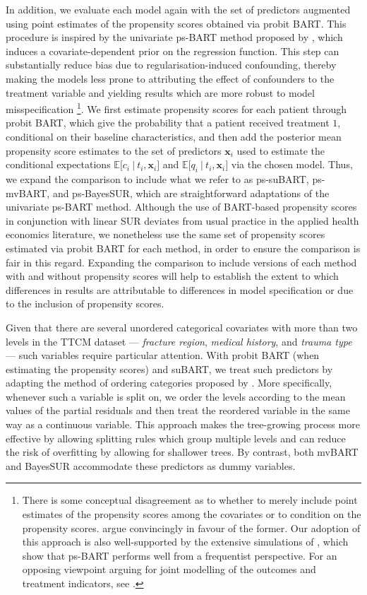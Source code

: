 \documentclass[aoas,preprint]{imsart}
\newcommand\given[1][]{\:#1\vert\:}
\theoremstyle{plain}
\theoremstyle{definition}
\theoremstyle{remark}
\begin{document}
In addition, we evaluate each model again with the set of predictors augmented using point estimates of the propensity scores obtained via probit BART. This procedure is inspired by the univariate ps-BART method proposed by \citet{hahn2020bayesian}, which induces a covariate-dependent prior on the regression function. This step 
can substantially reduce bias due to regularisation-induced confounding, thereby making the models less prone to attributing the effect of confounders to the treatment variable and yielding results which are more robust to model misspecification \citep{li2023bayesian}\footnote{
There is some conceptual disagreement as to whether to merely include point estimates of the propensity scores among the covariates or to condition on the propensity scores.
\citet[Section~8.3]{hahn2020bayesian} argue convincingly in favour of the former. Our adoption of this approach is also well-supported by the extensive simulations of \citet{dorie2019automated}, which show that ps-BART performs well from a frequentist perspective.
For an opposing viewpoint arguing for joint modelling of the outcomes and treatment indicators, see \citet[Section~5]{li2023bayesian}.}. We first estimate propensity scores for each patient through probit BART, which give the probability that a patient received treatment $1$, conditional on their baseline characteristics, and then add the posterior mean propensity score estimates to the set of predictors $\mathbf{x}_i$ used to estimate the conditional expectations $\mathbb{E}\lbrack c_i\given t_i, \mathbf{x}_i\rbrack$ and $\mathbb{E}\lbrack q_i\given t_i, \mathbf{x}_i\rbrack$ via the chosen model. 
Thus, we expand the comparison to include what we refer to as ps-suBART, ps-mvBART, and ps-BayesSUR, which are straightforward adaptations of the univariate ps-BART method. Although the use of BART-based propensity scores in conjunction with linear SUR deviates from usual practice in the applied health economics literature, we nonetheless use the same set of propensity scores estimated via probit BART for each method, in order to ensure the comparison is fair in this regard. Expanding the comparison to include versions of each method with and without propensity scores will help to establish the extent to which differences in results are attributable to differences in model specification or due to the inclusion of propensity scores.

Given that there are several unordered categorical covariates with more than two levels in the TTCM dataset --- \textit{fracture region}, \textit{medical history}, and \textit{trauma type} --- such variables require particular attention. With probit BART (when estimating the propensity scores) and suBART, we treat such predictors by adapting the method of ordering categories proposed by \citet{breiman1984classification}.
More specifically, whenever such a variable is split on, we order the levels according to the mean values of the partial residuals and then treat the reordered variable in the same way as a continuous variable. This approach makes the tree-growing process more effective by allowing splitting rules which group multiple levels and can reduce the risk of overfitting by allowing for shallower trees. By contrast, both mvBART and BayesSUR accommodate these predictors as dummy variables.
\end{document}
